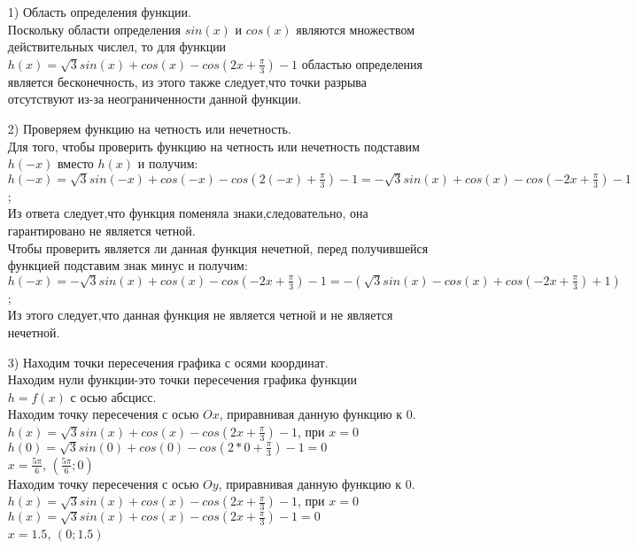 \documentclass[russian,utf8,nocolumnxxxi,nocolumnxxxii]{eskdtext}
\begin{document}
\begin{enumerate}
    \item[1)]Область определения функции.\\
    Поскольку области определения $sin(x)$ и $cos(x)$ являются множеством действительных числел, то для функции\\
    $h(x)=\sqrt{3}sin(x)+cos(x)-cos(2x+\frac{\pi}{3})-1$ областью определения является бесконечность, из этого также следует,что точки разрыва отсутствуют из-за неограниченности данной функции.
    \item[2)]Проверяем функцию на четность или нечетность.\\
    Для того, чтобы проверить функцию на четность или нечетность подставим $h(-x)$ вместо $h(x)$ и получим:\\
    $h(-x)=\sqrt{3}sin(-x)+cos(-x)-cos(2(-x)+\frac{\pi}{3})-1=-\sqrt{3}sin(x)+cos(x)-cos(-2x+\frac{\pi}{3})-1$;\\
    Из ответа следует,что функция поменяла знаки,следовательно, она гарантировано не является четной.\\
    Чтобы проверить является ли данная функция нечетной, перед получившейся функцией подставим знак минус и получим:\\
    $h(-x)=-\sqrt{3}sin(x)+cos(x)-cos(-2x+\frac{\pi}{3})-1=-(\sqrt{3}sin(x)-cos(x)+cos(-2x+\frac{\pi}{3})+1)$;\\
    Из этого следует,что данная функция не является четной и не является нечетной.
    \item[3)]Находим точки пересечения графика с осями координат.\\
    Находим нули функции-это точки пересечения графика функции\\
    $h=f(x)$ с осью абсцисс.\\
    Находим точку пересечения с осью $Ox$, приравнивая данную функцию к $0$.\\
    $h(x)=\sqrt{3}sin(x)+cos(x)-cos(2x+\frac{\pi}{3})-1$, при $x=0$\\
    $h(0)=\sqrt{3}sin(0)+cos(0)-cos(2*0+\frac{\pi}{3})-1=0$\\
    $x=\frac{5\pi}{6}$, $(\frac{5\pi}{6};0)$\\
    Находим точку пересечения с осью $Oy$, приравнивая данную функцию к $0$.\\
    $h(x)=\sqrt{3}sin(x)+cos(x)-cos(2x+\frac{\pi}{3})-1$, при $x=0$\\
    $h(x)=\sqrt{3}sin(x)+cos(x)-cos(2x+\frac{\pi}{3})-1=0$\\
    $x=1.5$, $(0;1.5)$\\
    

\end{enumerate}
\end{document}
